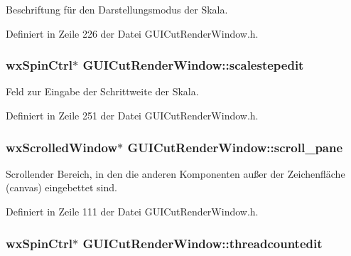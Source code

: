 Beschriftung für den Darstellungsmodus der Skala. 



Definiert in Zeile 226 der Datei G\-U\-I\-Cut\-Render\-Window.\-h.

\hypertarget{classGUICutRenderWindow_a4fbe9115e418be48a70eff31e94640ba}{
\subsubsection[{scalestepedit}]{\setlength{\rightskip}{0pt plus 5cm}wx\-Spin\-Ctrl$\ast$ G\-U\-I\-Cut\-Render\-Window\-::scalestepedit\hspace{0.3cm}{\ttfamily [private]}}}\label{classGUICutRenderWindow_a4fbe9115e418be48a70eff31e94640ba}


Feld zur Eingabe der Schrittweite der Skala. 



Definiert in Zeile 251 der Datei G\-U\-I\-Cut\-Render\-Window.\-h.

\hypertarget{classGUICutRenderWindow_a28c430f7145860ba3265fa9b8417923d}{
\subsubsection[{scroll\-\_\-pane}]{\setlength{\rightskip}{0pt plus 5cm}wx\-Scrolled\-Window$\ast$ G\-U\-I\-Cut\-Render\-Window\-::scroll\-\_\-pane\hspace{0.3cm}{\ttfamily [private]}}}\label{classGUICutRenderWindow_a28c430f7145860ba3265fa9b8417923d}


Scrollender Bereich, in den die anderen Komponenten außer der Zeichenfläche (canvas) eingebettet sind. 



Definiert in Zeile 111 der Datei G\-U\-I\-Cut\-Render\-Window.\-h.

\hypertarget{classGUICutRenderWindow_ae48406dc8c80240904ca7040b7b3fbf1}{
\subsubsection[{threadcountedit}]{\setlength{\rightskip}{0pt plus 5cm}wx\-Spin\-Ctrl$\ast$ G\-U\-I\-Cut\-Render\-Window\-::threadcountedit\hspace{0.3cm}{\ttfamily [private]}}}\label{classGUICutRenderWindow_ae48406dc8c80240904ca7040b7b3fbf1}


